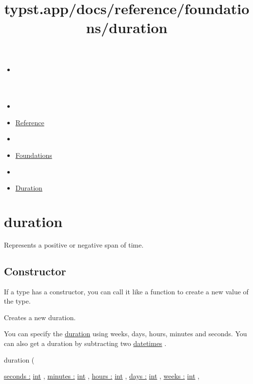 \title{typst.app/docs/reference/foundations/duration}

\begin{itemize}
\tightlist
\item
  \href{/docs}{}
\item
  
\item
  \href{/docs/reference/}{Reference}
\item
  
\item
  \href{/docs/reference/foundations/}{Foundations}
\item
  
\item
  \href{/docs/reference/foundations/duration/}{Duration}
\end{itemize}

\section{\texorpdfstring{{ duration }}{ duration }}\label{summary}

Represents a positive or negative span of time.

\subsection{\texorpdfstring{Constructor
{}}{Constructor }}\label{constructor}

\label{constructor-constructor-tooltip}
If a type has a constructor, you can call it like a function to create a
new value of the type.

Creates a new duration.

You can specify the
\href{/docs/reference/foundations/duration/}{duration} using weeks,
days, hours, minutes and seconds. You can also get a duration by
subtracting two \href{/docs/reference/foundations/datetime/}{datetimes}
.

{ duration } (

{ \hyperref[constructor-parameters-seconds]{seconds :}
\href{/docs/reference/foundations/int/}{int} , } {
\hyperref[constructor-parameters-minutes]{minutes :}
\href{/docs/reference/foundations/int/}{int} , } {
\hyperref[constructor-parameters-hours]{hours :}
\href{/docs/reference/foundations/int/}{int} , } {
\hyperref[constructor-parameters-days]{days :}
\href{/docs/reference/foundations/int/}{int} , } {
\hyperref[constructor-parameters-weeks]{weeks :}
\href{/docs/reference/foundations/int/}{int} , }

